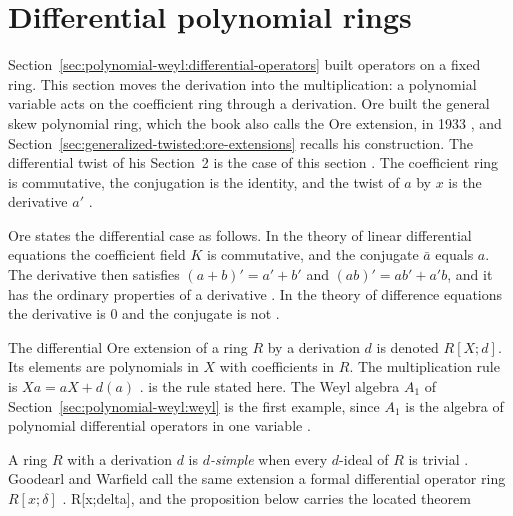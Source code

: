 \section{Differential polynomial rings}\label{sec:polynomial-weyl:ore-differential}

Section~\ref{sec:polynomial-weyl:differential-operators} built operators on a
fixed ring. This section moves the derivation into the multiplication: a
polynomial variable acts on the coefficient ring through a derivation. Ore
built the general skew polynomial ring, which the book also calls the Ore
extension, in 1933 \cite[p.~480]{Ore1933}, and
Section~\ref{sec:generalized-twisted:ore-extensions} recalls his construction.
The differential twist of his Section~2 is the case of this section
\cite[p.~482]{Ore1933}.
The coefficient ring is commutative, the conjugation is the
identity, and the twist of $a$ by $x$ is the derivative $a'$
\cite[p.~482]{Ore1933}.

\begin{remark}\label{rem:pw:ore-differential}
Ore states the differential case as follows. In the theory of linear
differential equations the coefficient field $K$ is commutative, and the
conjugate $\bar{a}$ equals $a$. The derivative then satisfies
$(a+b)'=a'+b'$ and $(ab)'=ab'+a'b$, and it has the ordinary properties
of a derivative \cite[p.~482]{Ore1933}.
In the theory of difference equations the derivative is
$0$ and the conjugate is not \cite[p.~482]{Ore1933}.
\end{remark}

The differential Ore extension of a ring $R$ by a derivation $d$ is denoted
$R[X;d]$. Its elements are polynomials in $X$ with coefficients in $R$. The
multiplication rule is $Xa=aX+d(a)$ \cite[p.~481, (3)]{Ore1933}.
is the rule stated here. The Weyl algebra $A_{1}$ of
Section~\ref{sec:polynomial-weyl:weyl} is the first example, since $A_{1}$ is
the algebra of polynomial differential operators in one variable
\cite[p.~1]{BelovKanelKontsevich2007}.

A ring $R$ with a derivation $d$ is \emph{$d$-simple} when every $d$-ideal of
$R$ is trivial \cite[p.~801]{Lequain2008}. Goodearl and Warfield call the same
extension a formal differential operator ring $R[x;\delta]$
\cite[p.~28]{GoodearlWarfield2004}.
R[x;delta], and the proposition below carries the located theorem

